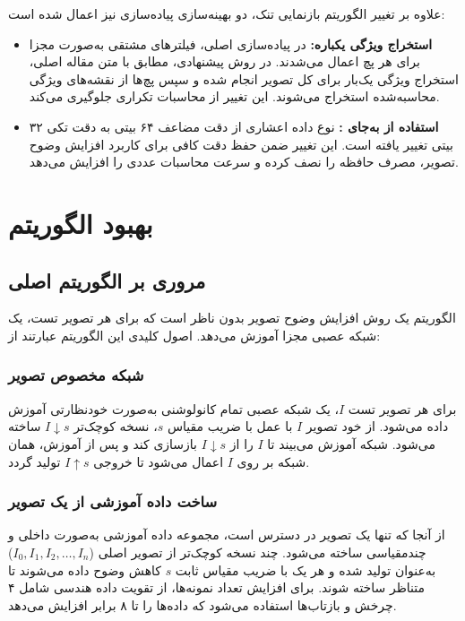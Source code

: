 علاوه بر تغییر الگوریتم بازنمایی تنک، دو بهینه‌سازی پیاده‌سازی نیز اعمال شده است:

\begin{itemize}
\item \textbf{استخراج ویژگی یکباره:} در پیاده‌سازی اصلی، فیلترهای مشتقی به‌صورت مجزا برای هر پچ اعمال می‌شدند. در روش پیشنهادی، مطابق با متن مقاله اصلی، استخراج ویژگی یک‌بار برای کل تصویر انجام شده و سپس پچ‌ها از نقشه‌های ویژگی محاسبه‌شده استخراج می‌شوند. این تغییر از محاسبات تکراری جلوگیری می‌کند.

\item \textbf{استفاده از  به‌جای :} نوع داده اعشاری از دقت مضاعف ۶۴ بیتی به دقت تکی ۳۲ بیتی تغییر یافته است. این تغییر ضمن حفظ دقت کافی برای کاربرد افزایش وضوح تصویر، مصرف حافظه را نصف کرده و سرعت محاسبات عددی را افزایش می‌دهد.
\end{itemize}


\section{بهبود الگوریتم }
\label{sec:zssr_improvement}

\subsection{مروری بر الگوریتم اصلی }
الگوریتم  یک روش افزایش وضوح تصویر بدون ناظر است که برای هر تصویر تست، یک شبکه عصبی مجزا آموزش می‌دهد. اصول کلیدی این الگوریتم عبارتند از:

\subsubsection{شبکه مخصوص تصویر}
برای هر تصویر تست $I$، یک شبکه عصبی تمام‌ کانولوشنی به‌صورت خودنظارتی آموزش داده می‌شود. از خود تصویر $I$ با عمل  با ضریب مقیاس $s$، نسخه کوچک‌تر $I{\downarrow s}$ ساخته می‌شود. شبکه آموزش می‌بیند تا $I$ را از $I{\downarrow s}$ بازسازی کند و پس از آموزش، همان شبکه بر روی $I$ اعمال می‌شود تا خروجی $I{\uparrow s}$ تولید گردد.

\subsubsection{ساخت داده آموزشی از یک تصویر}
از آنجا که تنها یک تصویر در دسترس است، مجموعه داده آموزشی به‌صورت داخلی و چندمقیاسی ساخته می‌شود. چند نسخه کوچک‌تر از تصویر اصلی ($I_0, I_1, I_2, \ldots, I_n$) به‌عنوان  تولید شده و هر یک با ضریب مقیاس ثابت $s$ کاهش وضوح داده می‌شوند تا  متناظر ساخته شوند. برای افزایش تعداد نمونه‌ها، از تقویت داده هندسی شامل ۴ چرخش و بازتاب‌ها استفاده می‌شود که داده‌ها را تا ۸ برابر افزایش می‌دهد.

